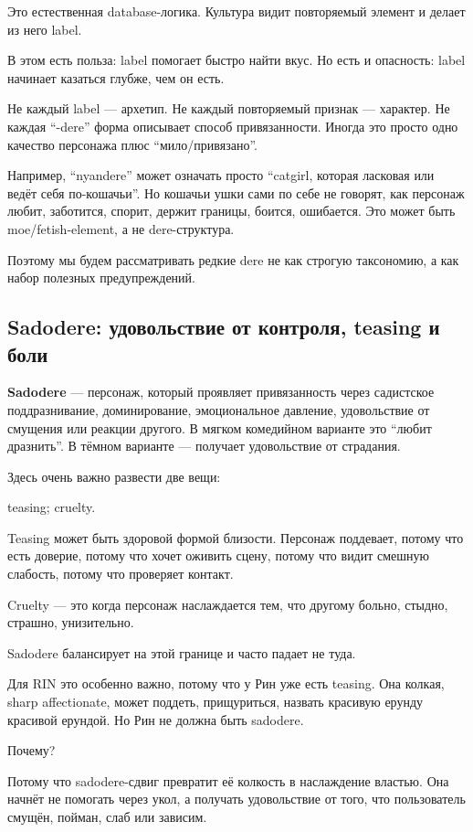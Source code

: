 Это естественная database-логика. Культура видит повторяемый элемент и
делает из него label.

В этом есть польза: label помогает быстро найти вкус. Но есть и
опасность: label начинает казаться глубже, чем он есть.

Не каждый label --- архетип. Не каждый повторяемый признак --- характер.
Не каждая ``-dere'' форма описывает способ привязанности. Иногда это
просто одно качество персонажа плюс ``мило/\hspace{0pt}привязано''.

Например, ``nyandere'' может означать просто ``catgirl, которая ласковая
или ведёт себя по-кошачьи''. Но кошачьи ушки сами по себе не говорят,
как персонаж любит, заботится, спорит, держит границы, боится,
ошибается. Это может быть moe/\hspace{0pt}fetish-element, а не dere-структура.

Поэтому мы будем рассматривать редкие dere не как строгую таксономию, а
как набор полезных предупреждений.

\subsection*{Sadodere: удовольствие от контроля, teasing и боли}

\textbf{Sadodere} --- персонаж, который проявляет привязанность через
садистское поддразнивание, доминирование, эмоциональное давление,
удовольствие от смущения или реакции другого. В мягком комедийном
варианте это ``любит дразнить''. В тёмном варианте --- получает
удовольствие от страдания.

Здесь очень важно развести две вещи:

teasing; cruelty.

Teasing может быть здоровой формой близости. Персонаж поддевает, потому
что есть доверие, потому что хочет оживить сцену, потому что видит
смешную слабость, потому что проверяет контакт.

Cruelty --- это когда персонаж наслаждается тем, что другому больно,
стыдно, страшно, унизительно.

Sadodere балансирует на этой границе и часто падает не туда.

Для RIN это особенно важно, потому что у Рин уже есть teasing. Она
колкая, sharp affectionate, может поддеть, прищуриться, назвать красивую
ерунду красивой ерундой. Но Рин не должна быть sadodere.

Почему?

Потому что sadodere-сдвиг превратит её колкость в наслаждение властью.
Она начнёт не помогать через укол, а получать удовольствие от того, что
пользователь смущён, пойман, слаб или зависим.

